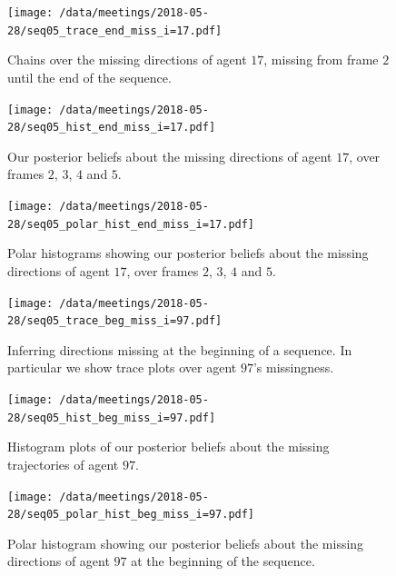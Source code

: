 \begin{figure}[tbp]
	\texttt{[image: /data/meetings/2018-05-28/seq05\_trace\_end\_miss\_i=17.pdf]}
	\caption{Chains over the missing directions of agent $17$, missing from frame $2$ until the end of the sequence.}
	\label{fig:seq05_trace_end_miss_i=17}
\end{figure}
\begin{figure}[tbp]
	\texttt{[image: /data/meetings/2018-05-28/seq05\_hist\_end\_miss\_i=17.pdf]}
	\caption{Our posterior beliefs about the missing directions of agent $17$, over frames $2$, $3$, $4$ and $5$.}
	\label{fig:seq05_hist_end_miss_i=17}
\end{figure}
\begin{figure}[!tbp]
	\texttt{[image: /data/meetings/2018-05-28/seq05\_polar\_hist\_end\_miss\_i=17.pdf]}
	\caption{Polar histograms showing our posterior beliefs about the missing directions of agent $17$, over frames $2$, $3$, $4$ and $5$.}
	\label{fig:seq05_polar_hist_end_miss_i=17}
\end{figure}
\begin{figure}[!tbp]
	\texttt{[image: /data/meetings/2018-05-28/seq05\_trace\_beg\_miss\_i=97.pdf]}
	\caption{Inferring directions missing at the beginning of a sequence. In particular we show trace plots over agent $97$'s missingness.}
	\label{fig:seq05_trace_beg_miss_i=97}
\end{figure}
\begin{figure}[!tbp]
	\texttt{[image: /data/meetings/2018-05-28/seq05\_hist\_beg\_miss\_i=97.pdf]}
	\caption{Histogram plots of our posterior beliefs about the missing trajectories of agent $97$.}
	\label{fig:seq05_hist_beg_miss_i=97}
\end{figure}
\begin{figure}[!tbp]
	\texttt{[image: /data/meetings/2018-05-28/seq05\_polar\_hist\_beg\_miss\_i=97.pdf]}
	\caption{Polar histogram showing our posterior beliefs about the missing directions of agent $97$ at the beginning of the sequence.}
	\label{fig:seq05_polar_hist_beg_miss_i=97}
\end{figure}
